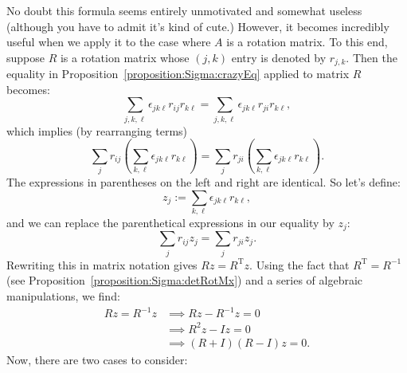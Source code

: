 No doubt this formula seems entirely unmotivated and somewhat useless (although you have to admit it's kind of cute.)  However, it becomes incredibly useful when we apply it to the case where $A$ is a rotation matrix. To this end, suppose $R$ is a rotation matrix whose $(j,k)$ entry is denoted by $r_{j,k}$. 
Then the equality in Proposition~\ref{proposition:Sigma:crazyEq} applied to matrix $R$  becomes:
\[ \sum_{j,k,\ell}\epsilon_{jk\ell} r_{ij}r_{k\ell} =  \sum_{j,k,\ell}\epsilon_{jk\ell} r_{ji}r_{k\ell}, \]
which implies (by rearranging terms)
\[ \sum_{j}r_{ij} \left( \sum_{k,\ell} \epsilon_{jk\ell} r_{k\ell} \right) 
=  \sum_{j}r_{ji} \left( \sum_{k,\ell} \epsilon_{jk\ell} r_{k\ell} \right). \]
The expressions in parentheses on the left and right are identical. So let's define:
\[ z_j :=  \sum_{k,\ell}\epsilon_{jk\ell} r_{k\ell}, \]
and we can replace the parenthetical expressions in our equality by $z_j$:
\[ \sum_{j}r_{ij} z_j=  \sum_{j}r_{ji} z_j. \]
Rewriting this in matrix notation gives $Rz = R^{\text{T}}z$. Using the fact that $R^{\text{T}} = R^{-1}$ (see Proposition~\ref{proposition:Sigma:detRotMx}) and a series of algebraic manipulations,  we find:
\begin{align*}
 Rz = R^{-1}z &\implies  Rz - R^{-1}z = 0 \\
&\implies R^2z - Iz = 0\\
& \implies  (R + I)(R-I)z = 0.
\end{align*}
Now, there are two cases to consider:
